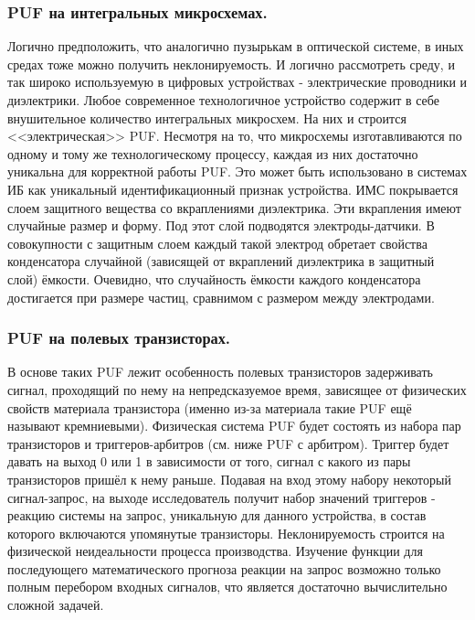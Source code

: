 \subsubsection{PUF на интегральных микросхемах. }
\label{sub:domain:puf_physical_types:ic}
Логично предположить, что аналогично пузырькам в оптической системе, в иных средах тоже можно получить неклонируемость. И логично рассмотреть среду, и так широко используемую в цифровых устройствах - электрические проводники и диэлектрики.
Любое современное технологичное устройство содержит в себе внушительное количество интегральных микросхем. На них и строится <<электрическая>> PUF. Несмотря на то, что микросхемы изготавливаются по одному и тому же технологическому процессу, каждая из них достаточно уникальна для корректной работы PUF. Это может быть использовано в системах ИБ как уникальный идентификационный признак устройства.
ИМС покрывается слоем защитного вещества со вкраплениями диэлектрика. Эти вкрапления имеют случайные размер и форму. Под этот слой подводятся электроды-датчики. В совокупности с защитным слоем каждый такой электрод обретает свойства конденсатора случайной (зависящей от вкраплений диэлектрика в защитный слой) ёмкости. Очевидно, что случайность ёмкости каждого конденсатора достигается при размере частиц, сравнимом с размером между электродами.


\subsubsection{PUF на полевых транзисторах. }
\label{sub:domain:puf_physical_types:transistors}
В основе таких PUF лежит особенность полевых транзисторов задерживать сигнал, проходящий по нему на непредсказуемое время, зависящее от физических свойств материала транзистора (именно из-за материала такие PUF ещё называют кремниевыми). Физическая система PUF будет состоять из набора пар транзисторов и триггеров-арбитров (см. ниже PUF с арбитром). Триггер будет давать на выход 0 или 1 в зависимости от того, сигнал с какого из пары транзисторов пришёл к нему раньше. Подавая на вход этому набору некоторый сигнал-запрос, на выходе исследователь получит набор значений триггеров - реакцию системы на запрос, уникальную для данного устройства, в состав которого включаются упомянутые транзисторы. Неклонируемость строится на физической неидеальности процесса производства. Изучение функции для последующего математического прогноза реакции на запрос возможно только полным перебором входных сигналов, что является достаточно вычислительно сложной задачей.


